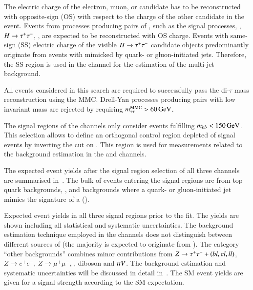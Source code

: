 The electric charge of the electron, muon, or \tauhadvis candidate has
to be reconstructed with opposite-sign (OS) with respect to the charge
of the other \tauhadvis candidate in the event. Events from processes
producing pairs of \tauleptons, such as the signal processes, \Zjets,
$H \to \tau^{+} \tau^{-}$, \ttbar, are expected to be reconstructed with OS
charge. Events with same-sign (SS) electric charge of the visible
$H \to \tau^{+} \tau^{-}$ candidate objects predominantly originate from events
with \tauhadvis mimicked by quark- or gluon-initiated jets. Therefore,
the SS region is used in the \hadhad channel for the estimation of the
multi-jet background.

All events considered in this search are required to successfully pass
the di-$\tau$ mass reconstruction using the MMC. Drell-Yan processes
producing \taulepton pairs with low invariant mass are rejected by
requiring $m_{\tau\tau}^\text{MMC} > \SI{60}{\ensuremath{\text{GeV}}}$.

The signal regions of the \lephad channels only consider events
fulfilling $m_{bb} < \SI{150}{\ensuremath{\text{GeV}}}$. This selection allows to define an
orthogonal \ttbar control region depleted of signal events by
inverting the cut on \mBB. This region is used for measurements
related to the \faketauhadvis background estimation in the \lephad and
\hadhad channels.

The expected event yields after the signal region selection of all
three channels are summarised in~. The
bulk of events entering the signal regions are from top quark
backgrounds, \Zjets, and backgrounds where a quark- or gluon-initiated
jet mimics the signature of a \tauhadvis (\jettotauhadvis).

\begin{table}[htbp]
  \centering

  \caption{Expected event yields in all three signal regions prior to
    the fit. The yields are shown including all statistical and
    systematic uncertainties. The \faketauhadvis background estimation
    technique employed in the \lephad channels does not distinguish
    between different sources of \faketauhadvis (the majority is
    expected to originate from \ttbar).  The category ``other
    backgrounds'' combines minor contributions from
    $Z \to \tau^{+} \tau^{-} + (bl,cl,ll)$, $Z \to e^{+}e^{-}$,
    $Z \to \mu^{+}\mu^{-}$, \Wjets, diboson and $t\bar{t} V$. The
    background estimation and systematic uncertainties will be
    discussed in detail
    in~. The SM \HH
    event yields are given for a signal strength according to the SM
    expectation.}%
  \label{tab:smhh_prefit_yields}%
  \label{tab:hadhad_presel_yields}

  \resizebox{\textwidth}{!}{
    
  }
\end{table}

